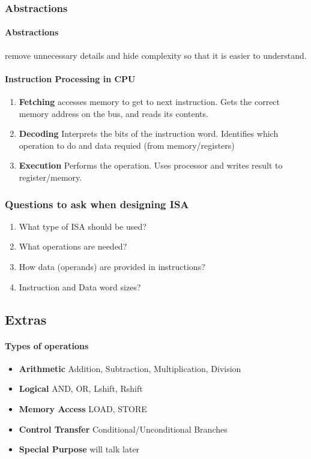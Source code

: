 \documentclass{article}
\newcommand\tab[1][0.5cm]{\hspace*{#1}}
\begin{document}
		\subsubsection{Abstractions}
			\paragraph{Abstractions} remove unnecessary details and hide complexity so that it is easier to understand. 

			\paragraph{\tab Instruction Processing in CPU}
			\begin{enumerate}
				\item \textbf{Fetching} accesses memory to get to next instruction. Gets the correct memory address on the bus, and reads its contents.
				\item \textbf{Decoding} Interprets the bits of the instruction word. Identifies which operation to do and data requied (from memory/registers)
				\item \textbf{Execution} Performs the operation. Uses processor and writes result to register/memory.
			\end{enumerate}

		\subsubsection{Questions to ask when designing ISA}
			\begin{enumerate}
				\item What type of ISA should be used?
				\item What operations are needed?
				\item How data (operands) are provided in instructions?
				\item Instruction and Data word sizes?
			\end{enumerate}

	\subsection{Extras}
		\paragraph{\tab Types of operations}
		\begin{itemize}
			\item \textbf{Arithmetic} Addition, Subtraction, Multiplication, Division
			\item \textbf{Logical} AND, OR, Lshift, Rshift
			\item \textbf{Memory Access} LOAD, STORE
			\item \textbf{Control Transfer} Conditional/Unconditional Branches
			\item \textbf{Special Purpose} will talk later
		\end{itemize}	
\end{document}
